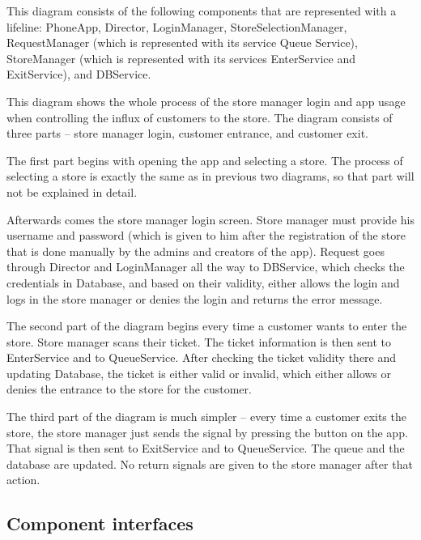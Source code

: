 This diagram consists of the following components that are represented with a lifeline: PhoneApp, Director, LoginManager, StoreSelectionManager, RequestManager (which is represented with its service Queue Service), StoreManager (which is represented with its services EnterService and ExitService), and DBService.  

  

This diagram shows the whole process of the store manager login and app usage when controlling the influx of customers to the store. The diagram consists of three parts – store manager login, customer entrance, and customer exit.  

  

The first part begins with opening the app and selecting a store. The process of selecting a store is exactly the same as in previous two diagrams, so that part will not be explained in detail.  

  

Afterwards comes the store manager login screen. Store manager must provide his username and password (which is given to him after the registration of the store that is done manually by the admins and creators of the app). Request goes through Director and LoginManager all the way to DBService, which checks the credentials in Database, and based on their validity, either allows the login and logs in the store manager or denies the login and returns the error message.  

  

The second part of the diagram begins every time a customer wants to enter the store. Store manager scans their ticket. The ticket information is then sent to EnterService and to QueueService. After checking the ticket validity there and updating Database, the ticket is either valid or invalid, which either allows or denies the entrance to the store for the customer.   

  

The third part of the diagram is much simpler – every time a customer exits the store, the store manager just sends the signal by pressing the button on the app. That signal is then sent to ExitService and to QueueService. The queue and the database are updated. No return signals are given to the store manager after that action.   


\newpage

\subsection{Component interfaces}

